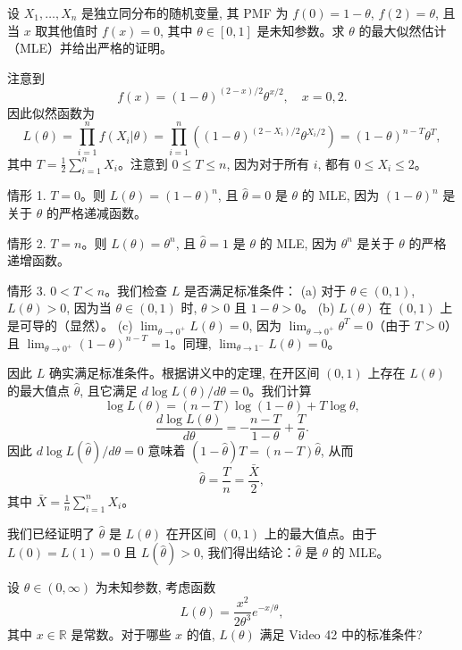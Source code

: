 \begin{questions}
\question
设 $X_1, \dots, X_n$ 是独立同分布的随机变量, 其 PMF 为 $f(0) = 1 - \theta$, $f(2) = \theta$, 且当 $x$ 取其他值时 $f(x) = 0$, 其中 $\theta \in [0, 1]$ 是未知参数。求 $\theta$ 的最大似然估计（MLE）并给出严格的证明。

\begin{solution}
注意到
\[
f(x) = (1 - \theta)^{(2 - x)/2} \theta^{x/2}, \quad x = 0, 2.
\]
因此似然函数为
\[
L(\theta) = \prod_{i=1}^n f(X_i | \theta) = \prod_{i=1}^n \left( (1 - \theta)^{(2 - X_i)/2} \theta^{X_i/2} \right) = (1 - \theta)^{n - T} \theta^T,
\]
其中 $T = \frac{1}{2} \sum_{i=1}^n X_i$。注意到 $0 \le T \le n$, 因为对于所有 $i$, 都有 $0 \le X_i \le 2$。

情形 1. $T = 0$。则 $L(\theta) = (1 - \theta)^n$, 且 $\hat{\theta} = 0$ 是 $\theta$ 的 MLE, 因为 $(1 - \theta)^n$ 是关于 $\theta$ 的严格递减函数。

情形 2. $T = n$。则 $L(\theta) = \theta^n$, 且 $\hat{\theta} = 1$ 是 $\theta$ 的 MLE, 因为 $\theta^n$ 是关于 $\theta$ 的严格递增函数。

情形 3. $0 < T < n$。我们检查 $L$ 是否满足标准条件：
(a) 对于 $\theta \in (0, 1)$, $L(\theta) > 0$, 因为当 $\theta \in (0, 1)$ 时, $\theta > 0$ 且 $1 - \theta > 0$。
(b) $L(\theta)$ 在 $(0, 1)$ 上是可导的（显然）。
(c) $\lim_{\theta \to 0^+} L(\theta) = 0$, 因为 $\lim_{\theta \to 0^+} \theta^T = 0$（由于 $T > 0$）且 $\lim_{\theta \to 0^+} (1 - \theta)^{n - T} = 1$。同理, $\lim_{\theta \to 1^-} L(\theta) = 0$。

因此 $L$ 确实满足标准条件。根据讲义中的定理, 在开区间 $(0, 1)$ 上存在 $L(\theta)$ 的最大值点 $\hat{\theta}$, 且它满足 $d \log L(\theta) / d\theta = 0$。我们计算
\[
\log L(\theta) = (n - T) \log(1 - \theta) + T \log \theta,
\]
\[
\frac{d \log L(\theta)}{d\theta} = -\frac{n - T}{1 - \theta} + \frac{T}{\theta}.
\]
因此 $d \log L(\hat{\theta}) / d\theta = 0$ 意味着 $(1 - \hat{\theta})T = (n - T)\hat{\theta}$, 从而
\[
\hat{\theta} = \frac{T}{n} = \frac{\bar{X}}{2},
\]
其中 $\bar{X} = \frac{1}{n} \sum_{i=1}^n X_i$。

我们已经证明了 $\hat{\theta}$ 是 $L(\theta)$ 在开区间 $(0, 1)$ 上的最大值点。由于 $L(0) = L(1) = 0$ 且 $L(\hat{\theta}) > 0$, 我们得出结论：$\hat{\theta}$ 是 $\theta$ 的 MLE。
\end{solution}

\question
设 $\theta \in (0, \infty)$ 为未知参数, 考虑函数
\[
L(\theta) = \frac{x^2}{2\theta^3} e^{-x/\theta},
\]
其中 $x \in \mathbb{R}$ 是常数。对于哪些 $x$ 的值, $L(\theta)$ 满足 Video 42 中的标准条件?


\end{questions}
